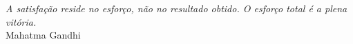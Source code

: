
\chapter*{}
\vspace{15cm}
\begin{flushright}

\textit{A satisfação reside no esforço, não no resultado obtido. O esforço total é a plena vitória.}
\medskip\\ 
Mahatma Gandhi
\end{flushright}